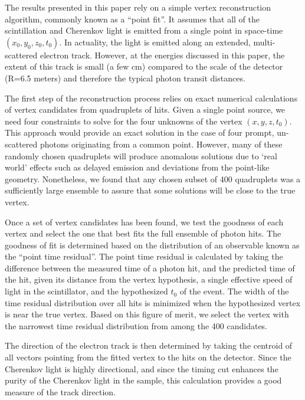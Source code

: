 \documentclass[aps,prc,twocolumn,groupedaddress,showpacs,amsmath,amssymb,floatfix,superscriptaddress]{revtex4}
\begin{document}
The results presented in this paper rely on a simple vertex
reconstruction algorithm, commonly known as a ``point
fit''\cite{SuperKalgo}. It assumes that all of the scintillation and
Cherenkov light is emitted from a single point in space-time
$(x_0,y_0,z_0,t_0)$. In actuality, the light is emitted along an
extended, multi-scattered electron track. However, at the energies
discussed in this paper, the extent of this track is small (a few cm)
compared to the scale of the detector (R=6.5 meters) and therefore the typical
photon transit distances.

The first step of the reconstruction process relies on exact numerical
calculations of vertex candidates from quadruplets of hits. Given a
single point source, we need four constraints to solve for the four
unknowns of the vertex $(x,y,z,t_0)$\cite{Smy}. This approach
would provide an exact solution in the case of four prompt,
un-scattered photons originating from a common point. However, many of
these randomly chosen quadruplets will produce anomalous solutions due
to `real world' effects such as delayed emission and deviations from the
point-like geometry. Nonetheless, we found that any chosen subset of
400 quadruplets was a sufficiently large ensemble to assure that some
solutions will be close to the true vertex.

Once a set of vertex candidates has been found, we test the goodness
of each vertex and select the one that best fits the full ensemble of
photon hits. The goodness of fit is determined based on the
distribution of an observable known as the ``point time
residual''\cite{SuperKalgo}. The point time residual is calculated by
taking the difference between the measured time of a photon hit, and
the predicted time of the hit, given its distance from the vertex
hypothesis, a single effective speed of light in the scintillator, and
the hypothesized $t_0$ of the event. The width of the time residual
distribution over all hits is minimized when the hypothesized vertex
is near the true vertex. Based on this figure of merit, we select the
vertex with the narrowest time residual distribution from among the
400 candidates.

The direction of the electron track is then determined by taking the
centroid of all vectors pointing from the fitted vertex to the hits on
the detector. Since the Cherenkov light is highly directional, and
since the timing cut enhances the purity of the Cherenkov light in the
sample, this calculation provides a good measure of the track
direction. 
\end{document}
